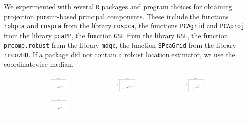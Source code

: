 \documentclass[ss]{imsart}
\theoremstyle{Example}
\begin{document}
We experimented with several \texttt{R} packages and program choices for obtaining projection pursuit-based principal components. These include 
the functions \texttt{robpca} and \texttt{rospca} from the library \texttt{rospca},
the functions \texttt{PCAgrid} and \texttt{PCAproj} from the library \texttt{pcaPP},
the function \texttt{GSE} from the library \texttt{GSE}, 
the function \texttt{prcomp.robust} from the library \texttt{mdqc}, 
the function \texttt{SPcaGrid} from the library \texttt{rrcovHD}. If a package did not contain a robust location estimator, we use the coordinatewise median.
%
 \begin{figure}
\begin{center}
\begin{tabular}{ccc}
\includegraphics[width=0.3\textwidth]{./RobustPCA_Figures/Iris_Sepal_PCA_Out_H0} &
\includegraphics[width=0.3\textwidth]{./RobustPCA_Figures/Iris_Sepal_PCA_Out_H1} &
\includegraphics[width=0.3\textwidth]{./RobustPCA_Figures/Iris_Sepal_PCA_Out_H2} \\
\includegraphics[width=0.3\textwidth]{./RobustPCA_Figures/Iris_Sepal_PCA_Out_GSE} &

\end{tabular}
\end{center}
\end{figure}
\end{document}
